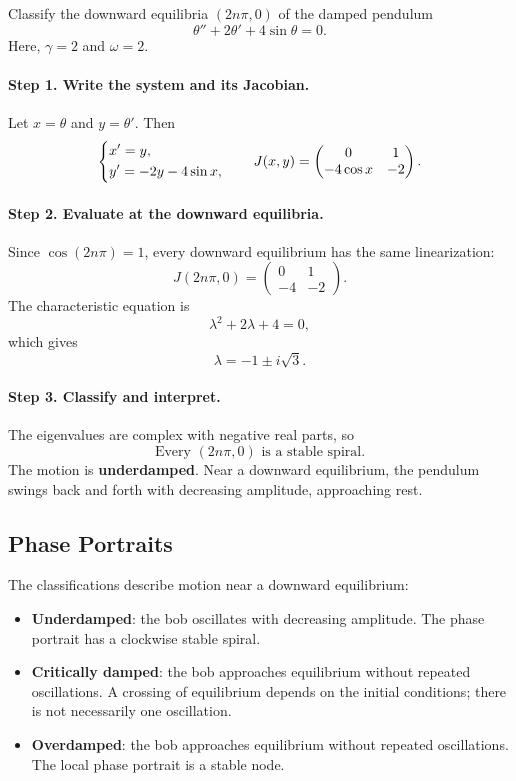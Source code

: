 \documentclass[11pt,letterpaper]{article}
\begin{document}
\begin{example}[3]{
Classify the downward equilibria $(2n\pi,0)$
of the damped pendulum
\[
\theta''+2\theta'+4\sin\theta=0.
\]
}
Here, $\gamma=2$ and $\omega=2$.

\paragraph{Step 1. Write the system and its Jacobian.}
Let $x=\theta$ and $y=\theta'$. Then
\[
\begin{dcases}
x'=y,\\
y'=-2y-4\sin x,
\end{dcases}
\qquad
J(x,y)=
\begin{pmatrix}
0&1\\
-4\cos x&-2
\end{pmatrix}.
\]

\paragraph{Step 2. Evaluate at the downward equilibria.}
Since $\cos(2n\pi)=1$, every downward equilibrium
has the same linearization:
\[
J(2n\pi,0)=
\begin{pmatrix}
0&1\\
-4&-2
\end{pmatrix}.
\]
The characteristic equation is
\[
\lambda^2+2\lambda+4=0,
\]
which gives
\[
\lambda=-1\pm i\sqrt{3}.
\]

\paragraph{Step 3. Classify and interpret.}
The eigenvalues are complex with negative real parts, so
\[
\boxed{\text{Every }(2n\pi,0)\text{ is a stable spiral}.}
\]
The motion is \textbf{underdamped}. Near a downward
equilibrium, the pendulum swings back and forth with
decreasing amplitude, approaching rest.
\end{example}
\subsection{Phase Portraits}

The classifications describe motion near a downward
equilibrium:
\begin{itemize}
    \item \textbf{Underdamped}: the bob oscillates
    with decreasing amplitude. The phase portrait has a clockwise stable spiral.

    \item \textbf{Critically damped}: the bob approaches
    equilibrium without repeated oscillations.
    A crossing of equilibrium depends on the initial
    conditions; there is not necessarily one oscillation.

    \item \textbf{Overdamped}: the bob approaches
    equilibrium without repeated oscillations.
    The local phase portrait is a stable node.
\end{itemize}
\end{document}
